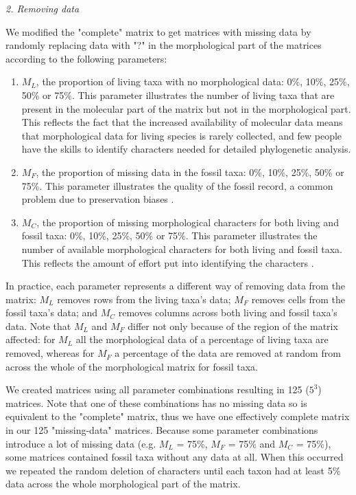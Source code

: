 \documentclass[12pt,letterpaper]{article}
\renewcommand{\subsection}[1]{%
\bigskip
\begin{center}
\begin{large}
\normalfont\itshape #1
\end{large}
\end{center}}
\begin{document}
\subsection{2. Removing data}
\label{Removing_data}
We modified the "complete" matrix to get matrices with missing data by randomly replacing data with "?" in the morphological part of the matrices according to the following parameters:
\begin{enumerate}
\item{$M_{L}$, the proportion of living taxa with no morphological data: 0\%, 10\%, 25\%, 50\% or 75\%.}
This parameter illustrates the number of living taxa that are present in the molecular part of the matrix but not in the morphological part. This reflects the fact that the increased availability of molecular data means that morphological data for living species is rarely collected, and few people have the skills to identify characters needed for detailed phylogenetic analysis.
\item{$M_{F}$, the proportion of missing data in the fossil taxa: 0\%, 10\%, 25\%, 50\% or 75\%.}
This parameter illustrates the quality of the fossil record, a common problem due to preservation biases \citep{sansomfossilization2013}. 
\item{$M_{C}$, the proportion of missing morphological characters for both living and fossil taxa: 0\%, 10\%, 25\%, 50\% or 75\%. }
This parameter illustrates the number of available morphological characters for both living and fossil taxa. This reflects the amount of effort put into identifying the characters \citep[e.g.][]{O'Leary08022013}.
\end{enumerate}

In practice, each parameter represents a different way of removing data from the matrix: $M_{L}$ removes rows from the living taxa's data; $M_{F}$ removes cells from the fossil taxa's data; and $M_{C}$ removes columns across both living and fossil taxa's data. Note that $M_{L}$ and $M_{F}$ differ not only because of the region of the matrix affected: for $M_{L}$ all the morphological data of a percentage of living taxa are removed, whereas for $M_{F}$ a percentage of the data are removed at random from across the whole of the morphological matrix for fossil taxa.

We created matrices using all parameter combinations resulting in 125 ($5^3$) matrices. Note that one of these combinations has no missing data so is equivalent to the "complete" matrix, thus we have one effectively complete matrix in our 125 "missing-data" matrices. Because some parameter combinations introduce a lot of missing data (e.g. $M_L$ = 75\%, $M_F$ = 75\% and $M_C$ = 75\%), some matrices contained fossil taxa without any data at all. When this occurred we repeated the random deletion of characters until each taxon had at least 5\% data across the whole morphological part of the matrix.
\end{document}
